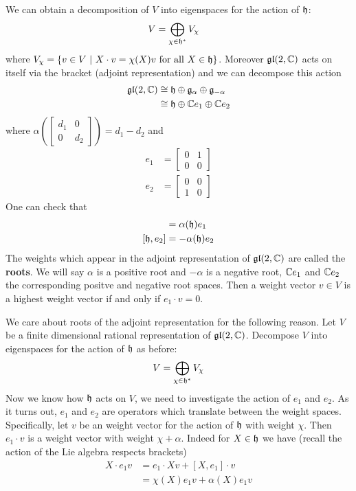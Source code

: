 \documentclass[12pt]{article}
\begin{document}
We can obtain a decomposition of $V$ into eigenspaces for the action of $\mathfrak{h}$: \begin{align*}
    V &= \bigoplus_{\chi\in \mathfrak{h}^*} V_\chi
\end{align*} where $V_\chi = \{v\in V \ \vert \  X\cdot v = \chi(X)v \text{ for all $X\in \mathfrak{h}$}\}$. Moreover
$\operatorname{\mathfrak{gl}}(2,\mathbb{C})$ acts on itself via the bracket (adjoint representation) and we can 
decompose this action \begin{align*}
    \operatorname{\mathfrak{gl}}(2,\mathbb{C}) &\cong \mathfrak{h} \oplus \mathfrak{g}_{\alpha} \oplus \mathfrak{g}_{-\alpha} \\
    &\cong \mathfrak{h} \oplus \mathbb{C} e_1 \oplus \mathbb{C} e_2
\end{align*} where $\alpha(\begin{bmatrix}
    d_1 & 0 \\
    0 & d_2
\end{bmatrix}) = d_1 - d_2$ and \begin{align*}
    e_1 &= \begin{bmatrix}
        0 & 1 \\
        0 & 0
    \end{bmatrix}\\
    e_2 &= \begin{bmatrix}
        0 & 0 \\
        1 & 0
    \end{bmatrix}
\end{align*} One can check that \begin{align*}
    [\mf h, e_1] &= \alpha(\mf h)e_1 \\ [\mf h, e_2] &= -\alpha(\mf h)e_2
\end{align*} The weights which appear in the adjoint representation of $\operatorname{\mathfrak{gl}}(2,\mathbb{C})$ are called the \textbf{roots}.
We will say $\alpha$ is a positive root and $-\alpha$ is a negative root, $\mathbb{C} e_1$ and $\mathbb{C} e_2$ the corresponding positve and negative root spaces.
Then a weight vector $v\in V$ is a highest weight vector if and only if $e_1\cdot v = 0$.

\hfill

We care about roots of the adjoint representation for the following reason. Let $V$ be a finite dimensional rational representation of $\operatorname{\mathfrak{gl}}(2,\mathbb{C})$.
Decompose $V$ into eigenspaces for the action of $\mathfrak{h}$ as before: \begin{align*}
    V = \bigoplus_{\chi \in \mathfrak{h}^*} V_\chi
\end{align*} Now we know how $\mathfrak{h}$ acts on $V$, we need to investigate the action of $e_1$ and $e_2$. As it turns out,
$e_1$ and $e_2$ are operators which translate between the weight spaces. 
Specifically, let $v$ be an weight vector for the action of $\mathfrak{h}$ with weight $\chi$. 
Then $e_1\cdot v$ is a weight vector with weight $\chi + \alpha$. Indeed for $X\in \mathfrak{h}$ we have (recall the action of the Lie algebra respects brackets) 
\begin{align*}
    X\cdot e_1v &= e_1 \cdot Xv + [X,e_1]\cdot v \\
    &= \chi(X)e_1v + \alpha(X)e_1v
\end{align*} 
\end{document}
